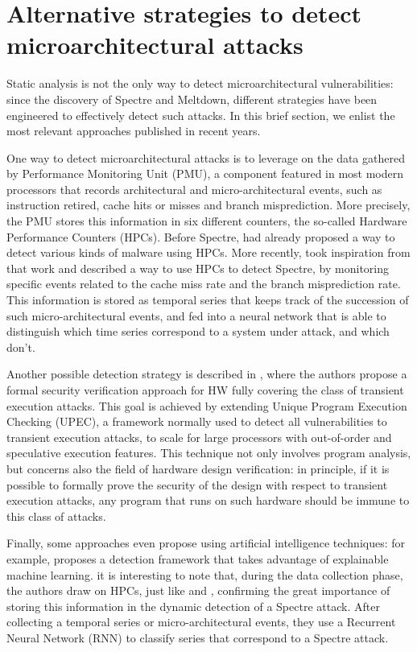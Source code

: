 \documentclass[12pt,a4paper]{book}
\theoremstyle{definition}
\begin{document}
	\section{Alternative strategies to detect microarchitectural attacks}\label{sec:alternatives}
	Static analysis is not the only way to detect microarchitectural vulnerabilities: since the discovery of Spectre and Meltdown, different strategies have been engineered to effectively detect such attacks. In this brief section, we enlist the most relevant approaches published in recent years.
	
	One way to detect microarchitectural attacks is to leverage on the data gathered by Performance Monitoring Unit (PMU), a component featured in most modern processors that records architectural and micro-architectural events, such as instruction retired, cache hits or misses and branch misprediction. More precisely, the PMU stores this information in six different counters, the so-called Hardware Performance Counters (HPCs). Before Spectre, \cite{Demme2013} had already proposed a way to detect various kinds of malware using HPCs. More recently, \cite{Congmiao2022} took inspiration from that work and described a way to use HPCs to detect Spectre, by monitoring specific events related to the cache miss rate and the branch misprediction rate. This information is stored as temporal series that keeps track of the succession of such micro-architectural events, and fed into a neural network that is able to distinguish which time series correspond to a system under attack, and which don't.
	
	Another possible detection strategy is described in \cite{Fadiheh2020}, where the authors propose a formal security verification approach for HW fully covering the class of transient execution attacks. This goal is achieved by extending Unique Program Execution Checking (UPEC), a framework normally used to detect all vulnerabilities to transient execution attacks, to scale for large processors with out-of-order and speculative execution features.
	This technique not only involves program analysis, but concerns also the field of hardware design verification: in principle, if it is possible to formally prove the security of the design with respect to transient execution attacks, any program that runs on such hardware should be immune to this class of attacks. 
	
	Finally, some approaches even propose using artificial intelligence techniques: for example, \cite{Pan2021} proposes a detection framework that takes advantage of explainable machine learning. it is interesting to note that, during the data collection phase, the authors draw on HPCs, just like \cite{Congmiao2022} and \cite{Demme2013}, confirming the great importance of storing this information in the dynamic detection of a Spectre attack. After collecting a temporal series or micro-architectural events, they use a Recurrent Neural Network (RNN) to classify series that correspond to a Spectre attack.
	
\end{document}
